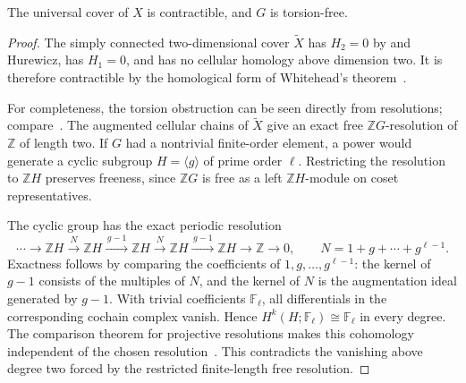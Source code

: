 \begin{corollary}\label{cor:torsion-free}
The universal cover of \(X\) is contractible, and \(G\) is torsion-free.
\end{corollary}
\begin{proof}
The simply connected two-dimensional cover \(\widetilde X\) has \(H_2=0\) by  and Hurewicz, has \(H_1=0\), and has no cellular homology above dimension two. It is therefore contractible by the homological form of Whitehead's theorem~\cite[Corollary~4.33]{Hatcher2002}.

For completeness, the torsion obstruction can be seen directly from resolutions; compare~\cite[Chapter~VIII, Section~2]{Brown1982}. The augmented cellular chains of \(\widetilde X\) give an exact free \(\mathbb ZG\)-resolution of \(\mathbb Z\) of length two. If \(G\) had a nontrivial finite-order element, a power would generate a cyclic subgroup \(H=\langle g\rangle\) of prime order \(\ell\). Restricting the resolution to \(\mathbb ZH\) preserves freeness, since \(\mathbb ZG\) is free as a left \(\mathbb ZH\)-module on coset representatives.

The cyclic group has the exact periodic resolution
\[
\cdots\longrightarrow\mathbb ZH
 \xrightarrow{\,N\,}\mathbb ZH
 \xrightarrow{\,g-1\,}\mathbb ZH
 \xrightarrow{\,N\,}\mathbb ZH
 \xrightarrow{\,g-1\,}\mathbb ZH
 \longrightarrow\mathbb Z\longrightarrow0,
 \qquad N=1+g+\cdots+g^{\ell-1}.
\]
Exactness follows by comparing the coefficients of \(1,g,\ldots,g^{\ell-1}\): the kernel of \(g-1\) consists of the multiples of \(N\), and the kernel of \(N\) is the augmentation ideal generated by \(g-1\). With trivial coefficients \(\mathbb F_\ell\), all differentials in the corresponding cochain complex vanish. Hence
\(H^k(H;\mathbb F_\ell)\cong\mathbb F_\ell\) in every degree. The comparison theorem for projective resolutions makes this cohomology independent of the chosen resolution~\cite[Chapter~I, Theorem~7.5, p.~24]{Brown1982}. This contradicts the vanishing above degree two forced by the restricted finite-length free resolution.
\end{proof}
